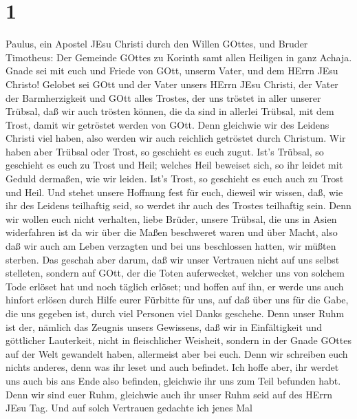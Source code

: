 \hypertarget{section}{%
\section{1}\label{section}}

 Paulus, ein Apostel JEsu Christi durch den Willen GOttes,
und Bruder Timotheus: Der Gemeinde GOttes zu Korinth samt allen Heiligen
in ganz Achaja.  Gnade sei mit euch und Friede von GOtt,
unserm Vater, und dem HErrn JEsu Christo!  Gelobet sei GOtt
und der Vater unsers HErrn JEsu Christi, der Vater der Barmherzigkeit
und GOtt alles Trostes,  der uns tröstet in aller unserer
Trübsal, daß wir auch trösten können, die da sind in allerlei Trübsal,
mit dem Trost, damit wir getröstet werden von GOtt.  Denn
gleichwie wir des Leidens Christi viel haben, also werden wir auch
reichlich getröstet durch Christum.  Wir haben aber Trübsal
oder Trost, so geschieht es euch zugut. Ist's Trübsal, so geschieht es
euch zu Trost und Heil; welches Heil beweiset sich, so ihr leidet mit
Geduld dermaßen, wie wir leiden. Ist's Trost, so geschieht es euch auch
zu Trost und Heil.  Und stehet unsere Hoffnung fest für
euch, dieweil wir wissen, daß, wie ihr des Leidens teilhaftig seid, so
werdet ihr auch des Trostes teilhaftig sein.  Denn wir
wollen euch nicht verhalten, liebe Brüder, unsere Trübsal, die uns in
Asien widerfahren ist da wir über die Maßen beschweret waren und über
Macht, also daß wir auch am Leben verzagten  und bei uns
beschlossen hatten, wir müßten sterben. Das geschah aber darum, daß wir
unser Vertrauen nicht auf uns selbst stelleten, sondern auf GOtt, der
die Toten auferwecket,  welcher uns von solchem Tode
erlöset hat und noch täglich erlöset; und hoffen auf ihn, er werde uns
auch hinfort erlösen  durch Hilfe eurer Fürbitte für uns,
auf daß über uns für die Gabe, die uns gegeben ist, durch viel Personen
viel Danks geschehe.  Denn unser Ruhm ist der, nämlich das
Zeugnis unsers Gewissens, daß wir in Einfältigkeit und göttlicher
Lauterkeit, nicht in fleischlicher Weisheit, sondern in der Gnade GOttes
auf der Welt gewandelt haben, allermeist aber bei euch. 
Denn wir schreiben euch nichts anderes, denn was ihr leset und auch
befindet. Ich hoffe aber, ihr werdet uns auch bis ans Ende also
befinden, gleichwie ihr uns zum Teil befunden habt.  Denn
wir sind euer Ruhm, gleichwie auch ihr unser Ruhm seid auf des HErrn
JEsu Tag.  Und auf solch Vertrauen gedachte ich jenes Mal
